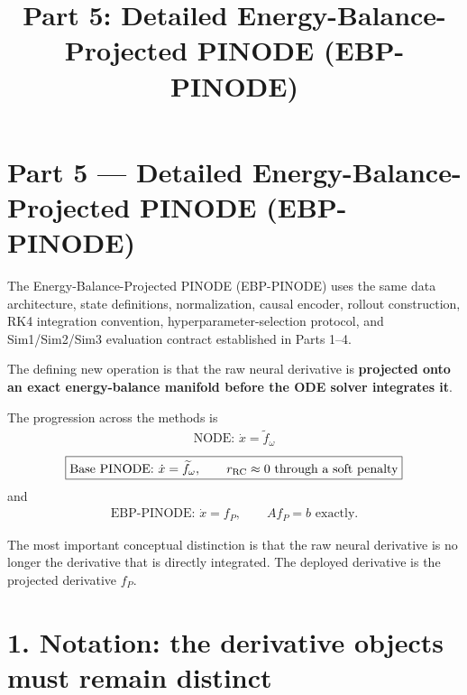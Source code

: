 \documentclass[11pt]{article}
\title{Part 5: Detailed Energy-Balance-Projected PINODE (EBP-PINODE)}
\author{}
\date{}
\begin{document}
\maketitle

\section*{Part 5 --- Detailed Energy-Balance-Projected PINODE (EBP-PINODE)}

The Energy-Balance-Projected PINODE (EBP-PINODE) uses the same data architecture, state definitions, normalization, causal encoder, rollout construction, RK4 integration convention, hyperparameter-selection protocol, and Sim1/Sim2/Sim3 evaluation contract established in Parts 1--4.

The defining new operation is that the raw neural derivative is \textbf{projected onto an exact energy-balance manifold before the ODE solver integrates it}.

The progression across the methods is
\begin{align}
\boxed{\text{NODE: }\dot x=\widetilde f_\omega}
\end{align}
\begin{align}
\boxed{\text{Base PINODE: }\dot x=\widetilde f_\omega,\qquad r_{\rm RC}\approx0\text{ through a soft penalty}}
\end{align}
and
\begin{align}
\boxed{\text{EBP-PINODE: }\dot x=f_P,\qquad Af_P=b\text{ exactly}.}
\end{align}

The most important conceptual distinction is that the raw neural derivative is no longer the derivative that is directly integrated. The deployed derivative is the projected derivative \(f_P\).

\section*{1. Notation: the derivative objects must remain distinct}
\end{document}
